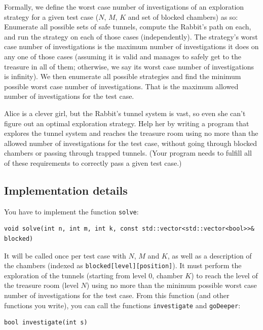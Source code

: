 \documentclass[12pt]{article}
\begin{document}
Formally, we define the worst case number of investigations of an exploration strategy for a given test case ($N$, $M$, $K$ and set of blocked chambers) as so: Enumerate all possible sets of safe tunnels, compute the Rabbit's path on each, and run the strategy on each of those cases (independently). The strategy's worst case number of investigations is the maximum number of investigations it does on any one of those cases (assuming it is valid and manages to safely get to the treasure in all of them; otherwise, we say its worst case number of investigations is infinity). We then enumerate all possible strategies and find the minimum possible worst case number of investigations. That is the maximum allowed number of investigations for the test case.

Alice is a clever girl, but the Rabbit's tunnel system is vast, so even she can't figure out an optimal exploration strategy. Help her by writing a program that explores the tunnel system and reaches the treasure room using no more than the allowed number of investigations for the test case, without going through blocked chambers or passing through trapped tunnels. (Your program needs to fulfill all of these requirements to correctly pass a given test case.)

\newpage

\subsection{Implementation details}

You have to implement the function \verb|solve|:

{
\footnotesize
\begin{verbatim}
void solve(int n, int m, int k, const std::vector<std::vector<bool>>& blocked)
\end{verbatim}
}

It will be called once per test case with $N$, $M$ and $K$, as well as a description of the chambers (indexed as \verb|blocked[level][position]|). It must perform the exploration of the tunnels (starting from level $0$, chamber $K$) to reach the level of the treasure room (level $N$) using no more than the minimum possible worst case number of investigations for the test case. From this function (and other functions you write), you can call the functions \verb|investigate| and \verb|goDeeper|:

\begin{verbatim}
bool investigate(int s)
\end{verbatim}
\end{document}
